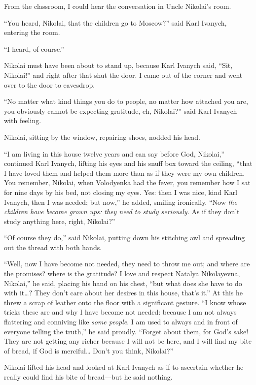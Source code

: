 From the classroom, I could hear the conversation in Uncle Nikolai's room.

``You heard, Nikolai, that the children go to Moscow?'' said Karl Ivanych, entering the room. %

``I heard, of course.'' %

Nikolai must have been about to stand up, because Karl Ivanych said, ``Sit, Nikolai!'' and right after that shut the door. I came out of the corner and went over to the door to eavesdrop.

``No matter what kind things you do to people, no matter how attached you are, you obviously cannot be expecting gratitude, eh, Nikolai?'' said Karl Ivanych with feeling. %

Nikolai, sitting by the window, repairing shoes, nodded his head.

``I am living in this house twelve years and can say before God, Nikolai,'' continued Karl Ivanych, lifting his eyes and his snuff box toward the ceiling, ``that I have loved them and helped them more than as if they were my own children. You remember, Nikolai, when Volodyenka had the fever, you remember how I sat for nine days by his bed, not closing my eyes. Yes: then I was nice, kind Karl Ivanych, then I was needed; but now,'' he added, smiling ironically. ``Now \emph{the children have become grown ups: they need to study seriously.} As if they don't study anything here, right, Nikolai?'' %

``Of course they do,'' said Nikolai, putting down his stitching awl and spreading out the thread with both hands. %

``Well, now I have become not needed, they need to throw me out; and where are the promises? where is the gratitude? I love and respect Natalya Nikolayevna, Nikolai,'' he said, placing his hand on his chest, ``but what does she have to do with it\ldots{}? They don't care about her desires in this house, that's it.'' At this he threw a scrap of leather onto the floor with a significant gesture. ``I know whose tricks these are and why I have become not needed: because I am not always flattering and conniving like \emph{some people}. I am used to always and in front of everyone telling the truth,'' he said proudly. ``Forget about them, for God's sake! They are not getting any richer because I will not be here, and I will find my bite of bread, if God is merciful\ldots{} Don't you think, Nikolai?'' %

Nikolai lifted his head and looked at Karl Ivanych as if to ascertain whether he really could find his bite of bread---but he said nothing.

